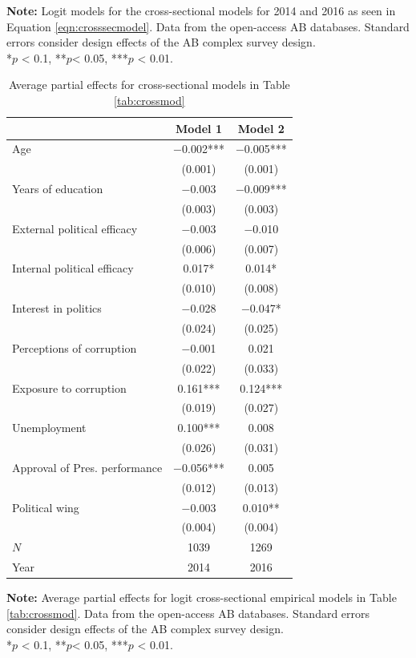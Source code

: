 \documentclass[12pt,a4]{article}\usepackage[]{graphicx}\usepackage[]{xcolor}
\begin{document}
\begin{table}[htbp]
\begin{center}
\end{center}
\textbf{Note:} Logit models for the cross-sectional models for 2014 and 2016 as seen in Equation \ref{eqn:crosssecmodel}. Data from the open-access AB databases. Standard errors consider design effects of the AB complex survey design.\\
*$p$ < 0.1, **$p$< 0.05, ***$p$ < 0.01.
\end{table}

\begin{table}[htbp]
\begin{center}
\caption{Average partial effects for cross-sectional models in Table \ref{tab:crossmod}}
\label{tab:apecross}

\begin{tabular}[t]{lcc}
\toprule
  & Model 1 & Model 2\\
\midrule
Age & \num{-0.002}*** & \num{-0.005}***\\
 & (\num{0.001}) & (\num{0.001})\\
Years of education & \num{-0.003} & \num{-0.009}***\\
 & (\num{0.003}) & (\num{0.003})\\
External political efficacy & \num{-0.003} & \num{-0.010}\\
 & (\num{0.006}) & (\num{0.007})\\
Internal political efficacy & \num{0.017}* & \num{0.014}*\\
 & (\num{0.010}) & (\num{0.008})\\
Interest in politics & \num{-0.028} & \num{-0.047}*\\
 & (\num{0.024}) & (\num{0.025})\\
Perceptions of corruption & \num{-0.001} & \num{0.021}\\
 & (\num{0.022}) & (\num{0.033})\\
Exposure to corruption & \num{0.161}*** & \num{0.124}***\\
 & (\num{0.019}) & (\num{0.027})\\
Unemployment & \num{0.100}*** & \num{0.008}\\
 & (\num{0.026}) & (\num{0.031})\\
Approval of Pres. performance & \num{-0.056}*** & \num{0.005}\\
 & (\num{0.012}) & (\num{0.013})\\
Political wing & \num{-0.003} & \num{0.010}**\\
 & (\num{0.004}) & (\num{0.004})\\
\midrule
$N$ & \num{1039} & \num{1269}\\
Year & 2014 & 2016\\
\bottomrule
\end{tabular}


\end{center}
\textbf{Note:} Average partial effects for logit cross-sectional empirical models in Table \ref{tab:crossmod}. Data from the open-access AB databases. Standard errors consider design effects of the AB complex survey design.\\
*$p$ < 0.1, **$p$< 0.05, ***$p$ < 0.01.
\end{table}
\end{document}
